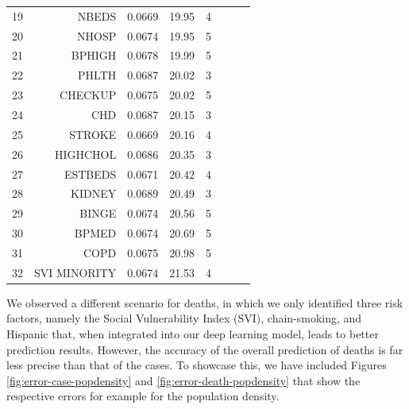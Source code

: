 \documentclass[a4paper, inpress]{jds} %
\renewcommand{\_}{%
    \textunderscore\hspace{0pt}%
}
\begin{document}
\begin{table}[!p]
\begin{tabular}{rrrrrlrl}
19	&	NBEDS	        &	0.0669	&	19.95	&	4	 \\
20	&	NHOSP	        &	0.0674	&	19.95	&	5	 \\
21	&	BPHIGH	        &	0.0678	&	19.99	&	5	 \\
22	&	PHLTH	        &	0.0687	&	20.02	&	3	 \\
23	&	CHECKUP	        &	0.0675	&	20.02	&	5	 \\
24	&	CHD	            &	0.0687	&	20.15	&	3	 \\
25	&	STROKE	        &	0.0669	&	20.16	&	4	 \\
26	&	HIGHCHOL	    &	0.0686	&	20.35	&	3	 \\
27	&	ESTBEDS	        &	0.0671	&	20.42	&	4	 \\
28	&	KIDNEY	        &	0.0689	&	20.49	&	3	 \\
29	&	BINGE	        &	0.0674	&	20.56	&	5	 \\
30	&	BPMED	        &	0.0674	&	20.69	&	5	 \\
31	&	COPD	        &	0.0675	&	20.98	&	5	 \\
32	&	SVI\_MINORITY	&	0.0674	&	21.53	&	4	 \\
\bottomrule
\end{tabular}
\end{table}

We observed a different scenario for deaths, in which we only
identified three risk factors, namely the Social Vulnerability Index
(SVI), chain-smoking, and Hispanic that, when integrated into our deep learning
model, leads to better prediction results. However, the accuracy of
the overall prediction of deaths is far less precise than that of the
cases. 
To showcase this, we have included Figures
\ref{fig:error-case-popdensity} and \ref{fig:error-death-popdensity}
that show the respective errors for example for the population density. 
\end{document}
